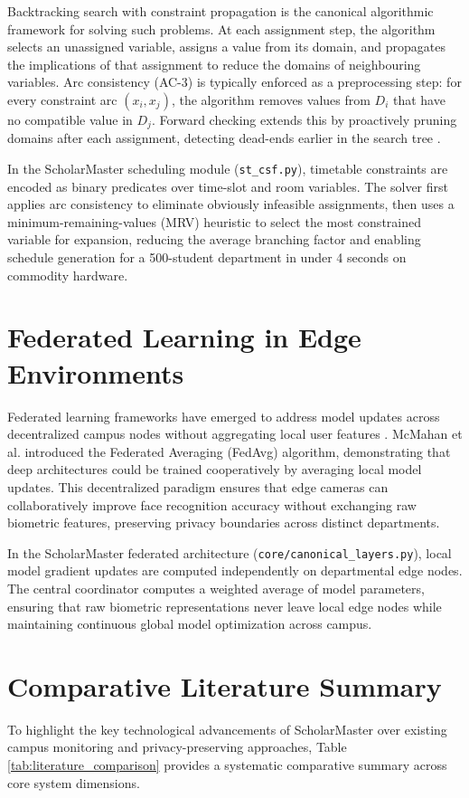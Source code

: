 \documentclass[12pt,a4paper,oneside]{report}
\begin{document}
Backtracking search with constraint propagation is the canonical algorithmic framework for solving such problems. At each assignment step, the algorithm selects an unassigned variable, assigns a value from its domain, and propagates the implications of that assignment to reduce the domains of neighbouring variables. Arc consistency (AC-3) is typically enforced as a preprocessing step: for every constraint arc $(x_i, x_j)$, the algorithm removes values from $D_i$ that have no compatible value in $D_j$. Forward checking extends this by proactively pruning domains after each assignment, detecting dead-ends earlier in the search tree \cite{koymans1990mtl, alur1994timed, pnueli1977temporal, clarke1999modelcheck}.

In the ScholarMaster scheduling module (\texttt{st\_csf.py}), timetable constraints are encoded as binary predicates over time-slot and room variables. The solver first applies arc consistency to eliminate obviously infeasible assignments, then uses a minimum-remaining-values (MRV) heuristic to select the most constrained variable for expansion, reducing the average branching factor and enabling schedule generation for a 500-student department in under 4 seconds on commodity hardware.

\section{Federated Learning in Edge Environments}
Federated learning frameworks have emerged to address model updates across decentralized campus nodes without aggregating local user features \cite{zhou2019edge, wang2020convergence}. McMahan et al. \cite{federated2017} introduced the Federated Averaging (FedAvg) algorithm, demonstrating that deep architectures could be trained cooperatively by averaging local model updates. This decentralized paradigm ensures that edge cameras can collaboratively improve face recognition accuracy without exchanging raw biometric features, preserving privacy boundaries across distinct departments.

In the ScholarMaster federated architecture (\texttt{core/canonical_layers.py}), local model gradient updates are computed independently on departmental edge nodes. The central coordinator computes a weighted average of model parameters, ensuring that raw biometric representations never leave local edge nodes while maintaining continuous global model optimization across campus.

\section{Comparative Literature Summary}
To highlight the key technological advancements of ScholarMaster over existing campus monitoring and privacy-preserving approaches, Table \ref{tab:literature_comparison} provides a systematic comparative summary across core system dimensions.
\end{document}
